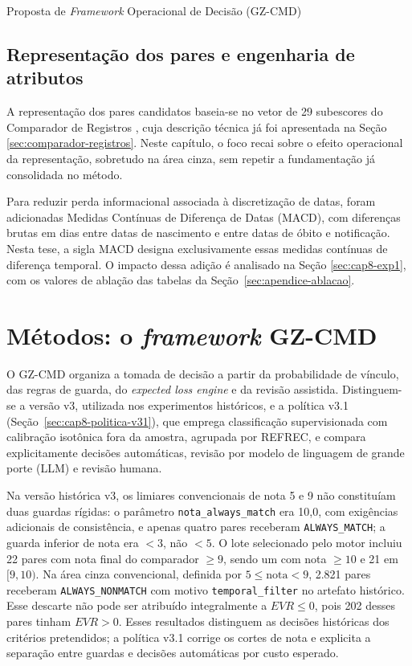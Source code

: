 \begin{chapter}{Proposta de \textit{Framework} Operacional de Decisão (GZ-CMD)}
\subsection{Representação dos pares e engenharia de atributos}
\label{sec:cap8-representacao}

A representação dos pares candidatos baseia-se no vetor de 29 subescores do Comparador de Registros \cite{Jardim2024comparador,Lucena2013algoritmos}, cuja descrição técnica já foi apresentada na Seção \ref{sec:comparador-registros}. Neste capítulo, o foco recai sobre o efeito operacional da representação, sobretudo na área cinza, sem repetir a fundamentação já consolidada no método.

Para reduzir perda informacional associada à discretização de datas, foram adicionadas Medidas Contínuas de Diferença de Datas (MACD), com diferenças brutas em dias entre datas de nascimento e entre datas de óbito e notificação. Nesta tese, a sigla MACD designa exclusivamente essas medidas contínuas de diferença temporal. O impacto dessa adição é analisado na Seção \ref{sec:cap8-exp1}, com os valores de ablação das tabelas da Seção~\ref{sec:apendice-ablacao}.

\section{Métodos: o \textit{framework} GZ-CMD}
\label{sec:cap8-metodos}

O GZ-CMD organiza a tomada de decisão a partir da probabilidade de vínculo, das regras de guarda, do \textit{expected loss engine} e da revisão assistida. Distinguem-se a versão v3, utilizada nos experimentos históricos, e a política v3.1 (Seção~\ref{sec:cap8-politica-v31}), que emprega classificação supervisionada com calibração isotônica fora da amostra, agrupada por REFREC, e compara explicitamente decisões automáticas, revisão por modelo de linguagem de grande porte (LLM) e revisão humana.

Na versão histórica v3, os limiares convencionais de nota 5 e 9 não constituíam duas guardas rígidas: o parâmetro \texttt{nota\_always\_match} era 10,0, com exigências adicionais de consistência, e apenas quatro pares receberam \texttt{ALWAYS\_MATCH}; a guarda inferior de nota era $<3$, não $<5$. O lote selecionado pelo motor incluiu 22 pares com nota final do comparador $\geq9$, sendo um com nota $\geq10$ e 21 em $[9,10)$. Na área cinza convencional, definida por $5\leq\text{nota}<9$, 2.821 pares receberam \texttt{ALWAYS\_NONMATCH} com motivo \texttt{temporal\_filter} no artefato histórico. Esse descarte não pode ser atribuído integralmente a $EVR\leq0$, pois 202 desses pares tinham $EVR>0$. Esses resultados distinguem as decisões históricas dos critérios pretendidos; a política v3.1 corrige os cortes de nota e explicita a separação entre guardas e decisões automáticas por custo esperado.


\end{chapter}
